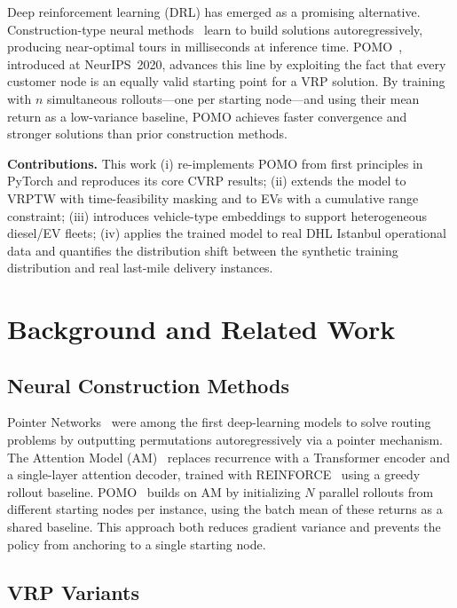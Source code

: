 \documentclass[conference]{IEEEtran}
\begin{document}
Deep reinforcement learning (DRL) has emerged as a promising alternative.
Construction-type neural methods~\cite{vinyals2015pointer, kool2019attention}
learn to build solutions autoregressively, producing near-optimal tours in
milliseconds at inference time. POMO~\cite{kwon2020pomo}, introduced at
NeurIPS~2020, advances this line by exploiting the fact that every customer
node is an equally valid starting point for a VRP solution. By training with
$n$ simultaneous rollouts---one per starting node---and using their mean
return as a low-variance baseline, POMO achieves faster convergence and
stronger solutions than prior construction methods.

\textbf{Contributions.} This work (i) re-implements POMO from first
principles in PyTorch and reproduces its core CVRP results; (ii) extends the
model to VRPTW with time-feasibility masking and to EVs with a cumulative
range constraint; (iii) introduces vehicle-type embeddings to support
heterogeneous diesel/EV fleets; (iv) applies the trained model to real DHL
Istanbul operational data and quantifies the distribution shift between the
synthetic training distribution and real last-mile delivery instances.

\section{Background and Related Work}

\subsection{Neural Construction Methods}

Pointer Networks~\cite{vinyals2015pointer} were among the first deep-learning
models to solve routing problems by outputting permutations autoregressively
via a pointer mechanism. The Attention Model (AM)~\cite{kool2019attention}
replaces recurrence with a Transformer encoder and a single-layer attention
decoder, trained with REINFORCE~\cite{williams1992} using a greedy rollout
baseline. POMO~\cite{kwon2020pomo} builds on AM by initializing $N$ parallel
rollouts from different starting nodes per instance, using the batch mean of
these returns as a shared baseline. This approach both reduces gradient
variance and prevents the policy from anchoring to a single starting node.

\subsection{VRP Variants}
\end{document}

